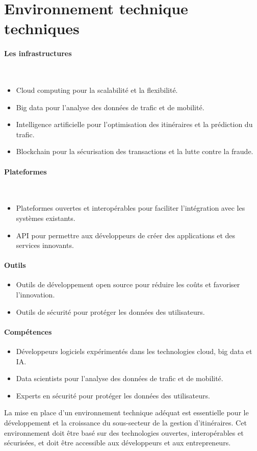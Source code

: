 
\section{Environnement technique techniques}

\paragraph{\textbf{Les infrastructures}}\\
\begin{itemize}
    \item Cloud computing pour la scalabilité et la flexibilité.
    \item Big data pour l'analyse des données de trafic et de mobilité.
    \item Intelligence artificielle pour l'optimisation des itinéraires et la prédiction du trafic.
    \item Blockchain pour la sécurisation des transactions et la lutte contre la fraude.
\end{itemize}
\paragraph{\textbf{Plateformes}}\\
\begin{itemize}
    \item Plateformes ouvertes et interopérables pour faciliter l'intégration avec les systèmes existants.
    \item API pour permettre aux développeurs de créer des applications et des services innovants.
\end{itemize}
\paragraph{\textbf{Outils}}
\begin{itemize}
    \item Outils de développement open source pour réduire les coûts et favoriser l'innovation.
    \item Outils de sécurité pour protéger les données des utilisateurs.
\end{itemize}
\paragraph{\textbf{Compétences}}
\begin{itemize}
    \item Développeurs logiciels expérimentés dans les technologies cloud, big data et IA.
    \item Data scientists pour l'analyse des données de trafic et de mobilité.
    \item Experts en sécurité pour protéger les données des utilisateurs.
\end{itemize}

La mise en place d'un environnement technique adéquat est essentielle pour le 
développement et la croissance du sous-secteur de la gestion d'itinéraires. Cet environnement doit être basé sur des technologies ouvertes, interopérables et sécurisées, et doit être accessible aux développeurs et aux entrepreneurs.
